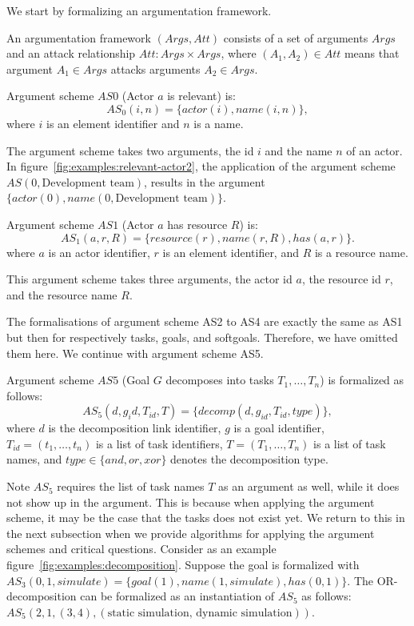 We start by formalizing an argumentation framework.

\begin{definition}
An argumentation framework $(Args,Att)$ consists of a set of arguments $Args$ and an attack relationship $Att:Args\times Args$, where $(A_1,A_2)\in Att$ means that argument $A_1\in Args$ attacks arguments $A_2\in Args$.
\end{definition}

\begin{definition}[AS0] Argument scheme $AS0$ (Actor $a$ is relevant) is: $$AS_0(i,n) = \{actor(i), name(i,n)\},$$ where $i$ is an element identifier and $n$ is a name.
\end{definition}

\rationale{} The argument scheme takes two arguments, the id $i$ and the name $n$ of an actor. In figure~\ref{fig:examples:relevant-actor2}, the application of the argument scheme $AS(0,\text{Development team})$, results in the argument $\{actor(0), name(0, \text{Development team})\}$.

\begin{definition}[AS1] Argument scheme $AS1$ (Actor $a$ has resource $R$) is: $$AS_1(a,r,R) = \{resource(r), name(r,R), has(a,r)\}.$$ where $a$ is an actor identifier, $r$ is an element identifier, and $R$ is a resource name. 
\end{definition}

\rationale{} This argument scheme takes three arguments, the actor id $a$, the resource id $r$, and the resource name $R$. 

The formalisations of argument scheme AS2 to AS4 are exactly the same as AS1 but then for respectively tasks, goals, and softgoals. Therefore, we have omitted them here. We continue with argument scheme AS5.

\begin{definition}[AS5] Argument scheme $AS5$ (Goal $G$ decomposes into tasks $T_1,\ldots,T_n$) is formalized as follows: $$AS_5(d, g_id,T_{id},T) = \{decomp(d, g_{id}, T_{id}, type)\},$$
where $d$ is the decomposition link identifier, $g$ is a goal identifier, $T_{id}=(t_1,\ldots,t_n)$ is a list of task identifiers, $T=(T_1,\ldots,T_n)$ is a list of task names, and $type\in\{and,or,xor\}$ denotes the decomposition type.
\end{definition}

\rationale{} Note $AS_5$ requires the list of task names $T$ as an argument as well, while it does not show up in the argument. This is because when applying the argument scheme, it may be the case that the tasks does not exist yet. We return to this in the next subsection when we provide algorithms for applying the argument schemes and critical questions. Consider as an example figure~\ref{fig:examples:decomposition}. Suppose the goal is formalized with $AS_3(0, 1, simulate)=\{goal(1), name(1, simulate), has(0,1)\}$. The OR-decomposition can be formalized as an instantiation of $AS_5$ as follows: $AS_5(2, 1, (3,4), (\text{static simulation, dynamic simulation}))$.

